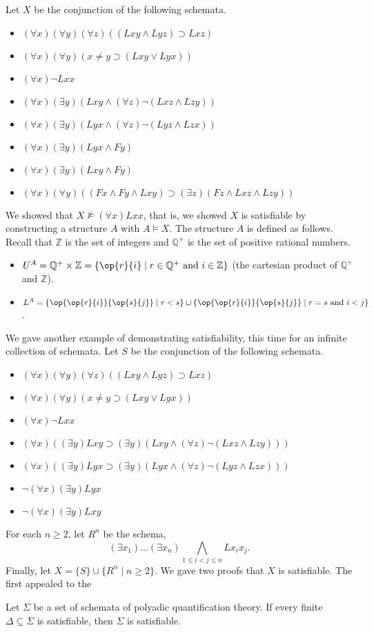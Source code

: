 Let $X$ be the conjunction of the following schemata.
\begin{itemize}
\item 
$(\forall x)(\forall y)(\forall z)((Lxy \wedge Lyz) \supset Lxz)$
\item
$(\forall x)(\forall y)(x\neq y\supset(Lxy \vee Lyx))$
\item
$(\forall x) \neg Lxx$
\item 
$(\forall x)(\exists y)(Lxy\wedge (\forall z)\neg (Lxz\wedge Lzy))$
\item 
$(\forall x)(\exists y)(Lyx\wedge (\forall z)\neg (Lyz\wedge Lzx))$
\item
$(\forall x)(\exists y)(Lyx\wedge Fy)$
\item
$(\forall x)(\exists y)(Lxy\wedge Fy)$
\item
$(\forall x)(\forall y)((Fx\wedge Fy\wedge Lxy)\supset (\exists z)(Fz\wedge Lxz\wedge Lzy))$
\end{itemize}

We showed that $X\not\models(\forall x)Lxx$, that is, we showed $X$ is satisfiable by constructing a structure $A$ with $A\models X$. The structure $A$ is defined as follows. Recall that $\mathbb{Z}$ is the set of integers and $\mathbb{Q}^+$ is the set of positive rational numbers.
\begin{itemize}
\item
$U^A= \mathbb{Q}^+\times\mathbb{Z}=\{\op{r}{i}\mid r\in\mathbb{Q}^+\mbox{ and}\ i\in \mathbb{Z}\}$ (the cartesian product of $\mathbb{Q}^+$ and $\mathbb{Z}$).
\item
$L^A=\{\op{\op{r}{i}}{\op{s}{j}}\mid r<s\}\cup\{\op{\op{r}{i}}{\op{s}{j}}\mid r=s\mbox{ and }i<j\}$.
\end{itemize}

We gave another example of demonstrating satisfiability, this time for an infinite collection of schemata. Let $S$ be the conjunction of the following schemata.
\begin{itemize}
\item 
$(\forall x)(\forall y)(\forall z)((Lxy \wedge Lyz) \supset Lxz)$
\item
$(\forall x)(\forall y)(x\neq y\supset(Lxy \vee Lyx))$
\item
$(\forall x) \neg Lxx$
\item 
$(\forall x)((\exists y)Lxy\supset(\exists y)(Lxy\wedge (\forall z)\neg (Lxz\wedge Lzy)))$
\item 
$(\forall x)((\exists y)Lyx\supset(\exists y)(Lyx\wedge (\forall z)\neg (Lyz\wedge Lzx)))$
\item
$\neg(\forall x)(\exists y)Lyx$
\item
$\neg(\forall x)(\exists y)Lxy$
\end{itemize}
For each $n\geq 2$, let $R^n$ be the schema, 
\[
(\exists x_1)\ldots(\exists x_n)\bigwedge_{1\leq i< j\leq n}Lx_ix_j.
\]
Finally, let $X=\{S\}\cup\{R^n\mid n\geq 2\}$. We gave two proofs that $X$ is satisfiable. The first appealed to the 
\begin{theorem}
Let $\Sigma$ be a set of schemata of polyadic quantification theory. If every finite $\Delta\subseteq\Sigma$ is satisfiable, then $\Sigma$ is satisfiable.
\end{theorem}

